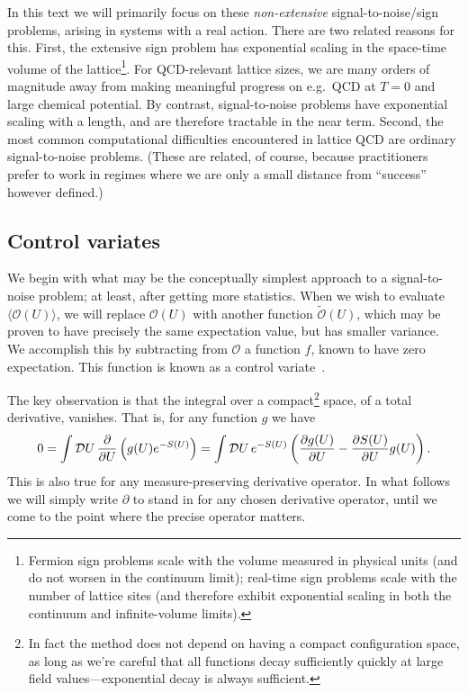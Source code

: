 \documentclass[12pt]{article}
\begin{document}
In this text we will primarily focus on these \emph{non-extensive} signal-to-noise/sign problems, arising in systems with a real action.
There are two related reasons for this. First, the extensive sign problem has exponential scaling in the space-time volume of the lattice\footnote{Fermion sign problems scale with the volume measured in physical units (and do not worsen in the continuum limit); real-time sign problems scale with the number of lattice sites (and therefore exhibit exponential scaling in both the continuum and infinite-volume limits).}. For QCD-relevant lattice sizes, we are many orders of magnitude away from making meaningful progress on e.g.~QCD at $T=0$ and large chemical potential. By contrast, signal-to-noise problems have exponential scaling with a length, and are therefore tractable in the near term. Second, the most common computational difficulties encountered in lattice QCD are ordinary signal-to-noise problems. (These are related, of course, because practitioners prefer to work in regimes where we are only a small distance from ``success'' however defined.)

\subsection{Control variates}

We begin with what may be the conceptually simplest approach to a signal-to-noise problem; at least, after getting more statistics. When we wish to evaluate $\langle \mathcal O(U) \rangle$, we will replace $\mathcal O(U)$ with another function $\tilde {\mathcal O}(U)$, which may be proven to have precisely the same expectation value, but has smaller variance. We accomplish this by subtracting from $\mathcal O$ a function $f$, known to have zero expectation. This function is known as a control variate~\cite{Bhattacharya:2023pxx}.

The key observation is that the integral over a compact\footnote{In fact the method does not depend on having a compact configuration space, as long as we're careful that all functions decay sufficiently quickly at large field values---exponential decay is always sufficient.} space, of a total derivative, vanishes. That is, for any function $g$ we have
\begin{equation}
    0 = \int \mathcal D U \,\frac{\partial}{\partial U} \left(g(U) e^{-S(U)}\right)
    = \int \mathcal D U\,
    e^{-S(U)} \left( \frac{\partial g(U)}{\partial U} - \frac{\partial S(U)}{\partial U}g(U)\right)
    \text.
\end{equation}
This is also true for any measure-preserving derivative operator. In what follows we will simply write $\partial$ to stand in for any chosen derivative operator, until we come to the point where the precise operator matters.
\end{document}
